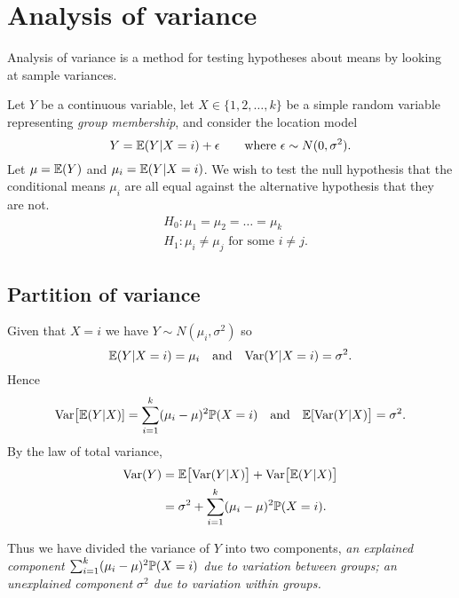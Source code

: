 
\section{Analysis of variance}\label{sec:anova}

Analysis of variance is a method for testing hypotheses about means by looking at sample variances.

\bigskip
Let $Y$ be a continuous variable, let $X\in\{1,2,\ldots,k\}$ be a simple random variable representing \emph{group membership}, and consider the location model
\[
Y = \mathbb{E}(Y|X=i) + \epsilon \qquad\text{where $\epsilon\sim N(0,\sigma^2)$.}
\]
Let $\mu = \mathbb{E}(Y)$ and $\mu_i = \mathbb{E}(Y|X=i)$. We wish to test the null hypothesis that the conditional means $\mu_i$ are all equal against the alternative hypothesis that they are not.
\begin{align*}
& H_0:\mu_1=\mu_2=\ldots=\mu_k \\
& H_1:\mu_i\neq\mu_j \text{ for some $i\neq j$}.
\end{align*}

\subsection{Partition of variance}

Given that $X=i$ we have $Y\sim N(\mu_i,\sigma^2)$ so
\[
\mathbb{E}(Y|X=i) = \mu_i \quad\text{and}\quad \text{Var}(Y|X=i) = \sigma^2.
\]
Hence
\[
\text{Var}\big[\mathbb{E}(Y|X)] = \sum_{i=1}^k (\mu_i-\mu)^2\mathbb{P}(X=i) \quad\text{and}\quad \mathbb{E}[\text{Var}(Y|X)\big] = \sigma^2.
\]
By the law of total variance, 
\begin{align*}
\text{Var}(Y)	& = \mathbb{E}\big[\text{Var}(Y|X)\big] + \text{Var}\big[\mathbb{E}(Y|X)\big] \\
		& = \sigma^2 + \sum_{i=1}^k (\mu_i-\mu)^2\mathbb{P}(X=i).
\end{align*}

Thus we have divided the variance of $Y$ into two components,
\bit
\it an \emph{explained} component $\sum_{i=1}^k (\mu_i-\mu)^2\mathbb{P}(X=i)$ due to variation \emph{between} groups;
\it an \emph{unexplained} component $\sigma^2$ due to variation \emph{within} groups.
\eit

